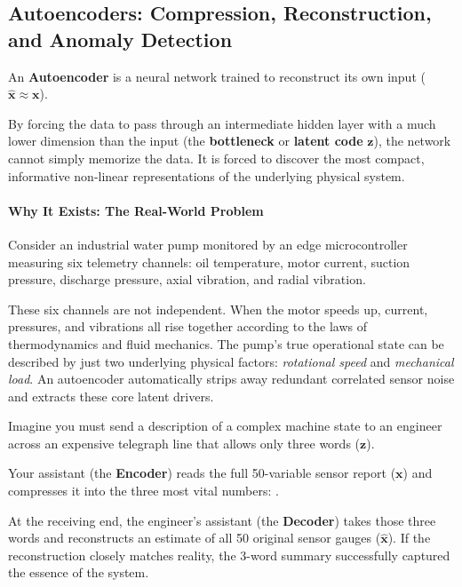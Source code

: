 \subsection{Autoencoders: Compression, Reconstruction, and Anomaly Detection}\label{subsec:autoencoders}

\begin{keyidea}
An \textbf{Autoencoder} is a neural network trained to reconstruct its own input ($\hat{\mathbf{x}} \approx \mathbf{x}$). 

By forcing the data to pass through an intermediate hidden layer with a much lower dimension than the input (the \textbf{bottleneck} or \textbf{latent code} $\mathbf{z}$), the network cannot simply memorize the data. It is forced to discover the most compact, informative non-linear representations of the underlying physical system.
\end{keyidea}

\paragraph{Why It Exists: The Real-World Problem}
Consider an industrial water pump monitored by an edge microcontroller measuring six telemetry channels: oil temperature, motor current, suction pressure, discharge pressure, axial vibration, and radial vibration. 

These six channels are not independent. When the motor speeds up, current, pressures, and vibrations all rise together according to the laws of thermodynamics and fluid mechanics. The pump's true operational state can be described by just two underlying physical factors: \emph{rotational speed} and \emph{mechanical load}. An autoencoder automatically strips away redundant correlated sensor noise and extracts these core latent drivers.

\begin{analogy}
Imagine you must send a description of a complex machine state to an engineer across an expensive telegraph line that allows only three words ($\mathbf{z}$). 

Your assistant (the \textbf{Encoder}) reads the full 50-variable sensor report ($\mathbf{x}$) and compresses it into the three most vital numbers: . 

At the receiving end, the engineer's assistant (the \textbf{Decoder}) takes those three words and reconstructs an estimate of all 50 original sensor gauges ($\hat{\mathbf{x}}$). If the reconstruction closely matches reality, the 3-word summary successfully captured the essence of the system.
\end{analogy}

